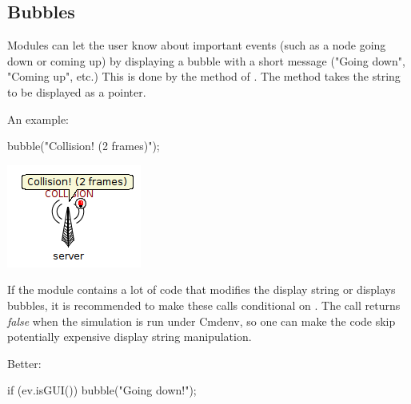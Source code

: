 \subsection{Bubbles}

Modules can let the user know about important events (such as a node
going down or coming up) by displaying a bubble with a short message
("Going down", "Coming up", etc.) This is done by the  method
of . The method takes the string to be displayed
as a  pointer.

An example:
\begin{cpp}
bubble("Collision! (2 frames)");
\end{cpp}

\begin{center}
\includegraphics{figures/graphics-bubble}
\end{center}

If the module contains a lot of code that modifies the display string or
displays bubbles, it is recommended to make these calls conditional
on . The  call returns \textit{false}
when the simulation is run under Cmdenv, so one can make the code skip
potentially expensive display string manipulation.

Better:
\begin{cpp}
if (ev.isGUI())
    bubble("Going down!");
\end{cpp}


